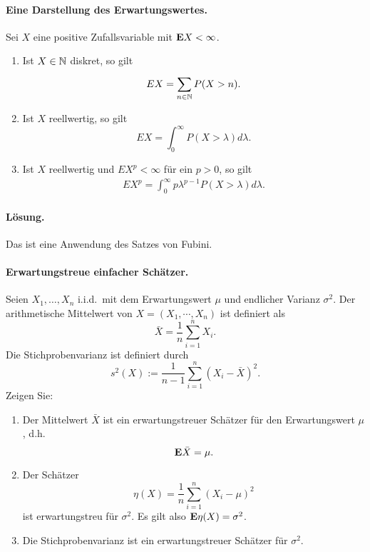\paragraph{Eine Darstellung des Erwartungswertes. } Sei $X$ eine
positive Zufallsvariable mit $\mathbf{E} X < \infty$. 
\begin{enumerate}
    \item Ist $X \in \mathbb N$ diskret, so gilt
        \begin{equation}
            E X = \sum_{n\in\mathbb N}^{} P(X>n).
        \end{equation}
    \item Ist $X$ reellwertig, so gilt
        \begin{equation}
            E X = \int_{0}^{\infty} P(X>\lambda) d\lambda.
        \end{equation}
    \item Ist $X$ reellwertig und $E X^p<\infty$ für ein $p>0$, so gilt
        \begin{eqnarray}
            E X^p = \int_{0}^{\infty} p\lambda^{p-1} P(X>\lambda) d\lambda.
        \end{eqnarray}
\end{enumerate} 

\paragraph*{Lösung.} Das ist eine Anwendung des Satzes von Fubini.

\paragraph{Erwartungstreue einfacher Schätzer.} 
Seien $X_1,\ldots,X_n$ i.i.d.\ mit dem Erwartungswert $\mu$ und endlicher
Varianz $\sigma^2$. Der arithmetische Mittelwert von $X=(X_1,\cdots,X_n)$ ist
definiert als
\begin{equation*}
    \bar X = \frac{1}{n} \sum_{i=1}^{n} X_i. 
\end{equation*}
Die Stichprobenvarianz ist definiert durch
\begin{equation*}
    s^2(X) := \frac{1}{n-1} \sum_{i=1}^{n} (X_i - \bar X)^2.
\end{equation*}
Zeigen Sie: 
\begin{enumerate}
    \item Der Mittelwert $\bar X$ ist ein erwartungstreuer Schätzer für den
        Erwartungswert $\mu$, d.h.\ 
        \begin{equation*}
            \mathbf{E} \bar X = \mu. 
        \end{equation*}
    \item Der Schätzer
        \begin{equation*}
            \eta(X) = \frac{1}{n} \sum_{i=1}^{n} \left( X_i - \mu \right)^2
        \end{equation*}
        ist erwartungstreu für $\sigma^2$. Es gilt also $\mathbf{E} \eta(X) = \sigma^2$.  
    \item Die Stichprobenvarianz ist ein erwartungstreuer Schätzer für $\sigma^2$. 
\end{enumerate}

